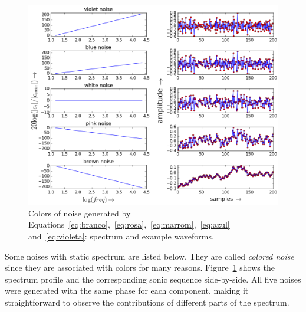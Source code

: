 \begin{figure}
	\hspace*{-.75cm}
         \includegraphics[width=1.\textwidth]{figures/ruidos_}
     \caption{Colors of noise generated by Equations~\ref{eq:branco},~\ref{eq:rosa},~\ref{eq:marrom},~\ref{eq:azul} and~\ref{eq:violeta}: spectrum and example waveforms.}
         \label{fig:ruidos}
\end{figure}

Some noises with static spectrum are listed below. They are called \emph{colored noise} since they are associated with colors for many reasons.
Figure~\ref{fig:ruidos} shows the spectrum profile and the corresponding sonic sequence side-by-side. All five noises were generated with the same phase for each component, making it straightforward to observe the contributions of different parts of the spectrum.

